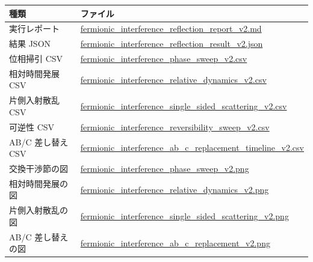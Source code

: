 \documentclass[
  a4paper,
]{article}
\newcounter{none} %
\begin{document}
{\def\LTcaptype{none} %
\begin{longtable}[]{@{}
  >{\raggedright\arraybackslash}p{}
  >{\raggedright\arraybackslash}p{}@{}}
\toprule\noalign{}
\begin{minipage}[b]{\linewidth}\raggedright
種類
\end{minipage} & \begin{minipage}[b]{\linewidth}\raggedright
ファイル
\end{minipage} \\
\midrule\noalign{}
\endhead
\bottomrule\noalign{}
\endlastfoot
実行レポート &
\href{fermionic_interference_reflection_result_v2/fermionic_interference_reflection_report_v2.md}{fermionic\_interference\_reflection\_report\_v2.md} \\
結果 JSON &
\href{fermionic_interference_reflection_result_v2/fermionic_interference_reflection_result_v2.json}{fermionic\_interference\_reflection\_result\_v2.json} \\
位相掃引 CSV &
\href{fermionic_interference_reflection_result_v2/fermionic_interference_phase_sweep_v2.csv}{fermionic\_interference\_phase\_sweep\_v2.csv} \\
相対時間発展 CSV &
\href{fermionic_interference_reflection_result_v2/fermionic_interference_relative_dynamics_v2.csv}{fermionic\_interference\_relative\_dynamics\_v2.csv} \\
片側入射散乱 CSV &
\href{fermionic_interference_reflection_result_v2/fermionic_interference_single_sided_scattering_v2.csv}{fermionic\_interference\_single\_sided\_scattering\_v2.csv} \\
可逆性 CSV &
\href{fermionic_interference_reflection_result_v2/fermionic_interference_reversibility_sweep_v2.csv}{fermionic\_interference\_reversibility\_sweep\_v2.csv} \\
AB/C 差し替え CSV &
\href{fermionic_interference_reflection_result_v2/fermionic_interference_ab_c_replacement_timeline_v2.csv}{fermionic\_interference\_ab\_c\_replacement\_timeline\_v2.csv} \\
交換干渉節の図 &
\href{fermionic_interference_reflection_result_v2/fermionic_interference_phase_sweep_v2.png}{fermionic\_interference\_phase\_sweep\_v2.png} \\
相対時間発展の図 &
\href{fermionic_interference_reflection_result_v2/fermionic_interference_relative_dynamics_v2.png}{fermionic\_interference\_relative\_dynamics\_v2.png} \\
片側入射散乱の図 &
\href{fermionic_interference_reflection_result_v2/fermionic_interference_single_sided_scattering_v2.png}{fermionic\_interference\_single\_sided\_scattering\_v2.png} \\
AB/C 差し替えの図 &
\href{fermionic_interference_reflection_result_v2/fermionic_interference_ab_c_replacement_v2.png}{fermionic\_interference\_ab\_c\_replacement\_v2.png} \\
\end{longtable}
}
\end{document}
